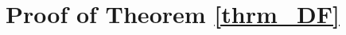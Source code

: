 \documentclass[journal]{IEEEtran}
\begin{document}
\section{Proof of Theorem \ref{thrm_DF}}
\label{apdx_thrm_DF}

\ifCLASSOPTIONcaptionsoff
  \newpage
\fi





\end{document}

